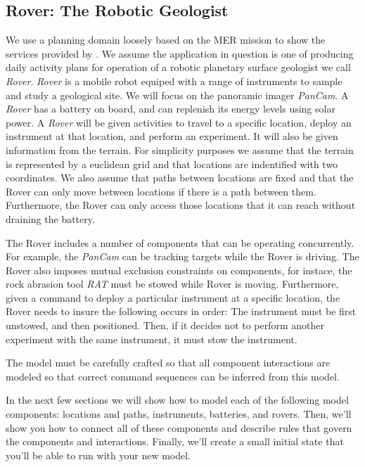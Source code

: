 \documentclass[10pt, letterpaper, twoside]{article}
\begin{document}
\subsection{Rover: The Robotic Geologist}

We use a planning domain loosely based on the MER mission to show the
services provided by \ET.  We assume the application in question is one of
producing daily activity plans for operation of a robotic planetary surface
geologist we call {\em Rover}. {\em Rover} is a mobile robot equiped with a
range of instruments to sample and study a geological site.  We will focus
on the panoramic imager {\em PanCam}. A {\em Rover} has a battery on board, and can
replenish its energy levels using solar power.  A {\em Rover} will be given
activities to travel to a specific location, deploy an instrument at that
location, and perform an experiment.  It will also be given information from
the terrain.  For simplicity purposes we assume that the terrain is
represented by a euclidean grid and that locations are indentified with two
coordinates.  We also assume that paths between locations are fixed and
that the Rover can only move between locations if there is a path
between them.  Furthermore, the Rover can only access those locations
that it can reach without draining the battery.

The Rover includes a number of components that can be operating
concurrently. For example, the {\em PanCam} can be tracking targets while
the Rover is driving. The Rover also imposes mutual exclusion constraints
on components, for instace, the rock abrasion tool {\em RAT}
must be stowed while Rover is moving. Furthermore, given a command to
deploy a particular instrument at a specific location, the Rover needs to
insure the following occurs in order: The instrument must be first
unstowed, and then positioned. Then, if it decides not to
perform another experiment with the same instrument, it must stow the
instrument. 

The model must be carefully crafted so that all component interactions are
modeled so that correct command sequences can be inferred from this model.

In the next few sections we will show how to model each of the following
model components: locations and paths, instruments, batteries, and rovers.
Then, we'll show you how to connect all of these components and describe
rules that govern the components and interactions.  Finally, we'll create a
small initial state that you'll be able to run with your new model.
\end{document}
